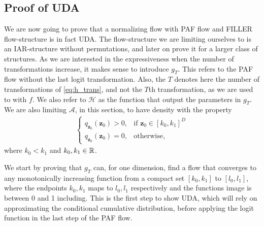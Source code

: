 \subsection{Proof of UDA}
We are now going to prove that a normalizing flow with PAF flow and FILLER flow-structure is in fact UDA. The flow-structure we are 
limiting ourselves to is an IAR-structure without permutations, and later on prove it for a larger class of structures. 
As we are interested in the
expressiveness when the number of transformations increase, it makes sense to introduce \(g_{T}\). This refers to the PAF flow without
the last logit transformation. Also, the \(T\) denotes here the number of transformations of \cref{eq:h_trans}, and not the \(T\)th transformation, 
as we are used to with \(f\).  
We also refer to \(\mathcal{H}\) as the function that output the parameters in \(g_{T}\). We are also limiting \(\mathcal{A}\), in this section,
to have density with the property
\begin{align*}
    \begin{cases}
        q_{\bm z_0}(\bm z_0) > 0, & \text{if \(\bm z_0 \in [k_0,k_1]^D\)}\\
        q_{\bm z_0}(\bm z_0) = 0, & \text{otherwise},
    \end{cases}
\end{align*}
where \(k_0 < k_1\) and \(k_0, k_1 \in \mathbb{R}\).

We start by proving that \(g_T\) can, for one dimension, find a flow that converges to any monotonically increasing function from a 
compact set \([k_0, k_1]\) to \([l_0,l_1]\), where the endpoints \(k_0,k_1\) maps to \(l_0,l_1\) respectively and the functions image
is between 0 and 1 including. 
This is the first step to show UDA, which will rely on approximating the conditional cumulative
distribution, before applying the logit function in the last step of the PAF flow.

